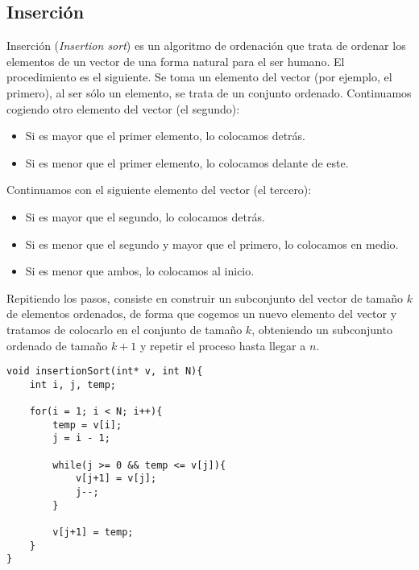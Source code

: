\subsection{Inserción} 
Inserción (\emph{Insertion sort}) es un algoritmo de ordenación que trata de ordenar los elementos de un vector de una forma natural para el ser humano. El procedimiento es el siguiente. Se toma un elemento del vector (por ejemplo, el primero), al ser sólo un elemento, se trata de un conjunto ordenado. Continuamos cogiendo otro elemento del vector (el segundo):
\begin{itemize}
    \item Si es mayor que el primer elemento, lo colocamos detrás.
    \item Si es menor que el primer elemento, lo colocamos delante de este.
\end{itemize}
Continuamos con el siguiente elemento del vector (el tercero):
\begin{itemize}
    \item Si es mayor que el segundo, lo colocamos detrás.
    \item Si es menor que el segundo y mayor que el primero, lo colocamos en medio. 
    \item Si es menor que ambos, lo colocamos al inicio.
\end{itemize}
Repitiendo los pasos, consiste en construir un subconjunto del vector de tamaño $k$ de elementos ordenados, de forma que cogemos un nuevo elemento del vector y tratamos de colocarlo en el conjunto de tamaño $k$, obteniendo un subconjunto ordenado de tamaño $k+1$ y repetir el proceso hasta llegar a $n$.
    \begin{verbatim}
void insertionSort(int* v, int N){
    int i, j, temp;

    for(i = 1; i < N; i++){
        temp = v[i];
        j = i - 1;

        while(j >= 0 && temp <= v[j]){
            v[j+1] = v[j];
            j--;
        }

        v[j+1] = temp;
    }
}
    \end{verbatim}

